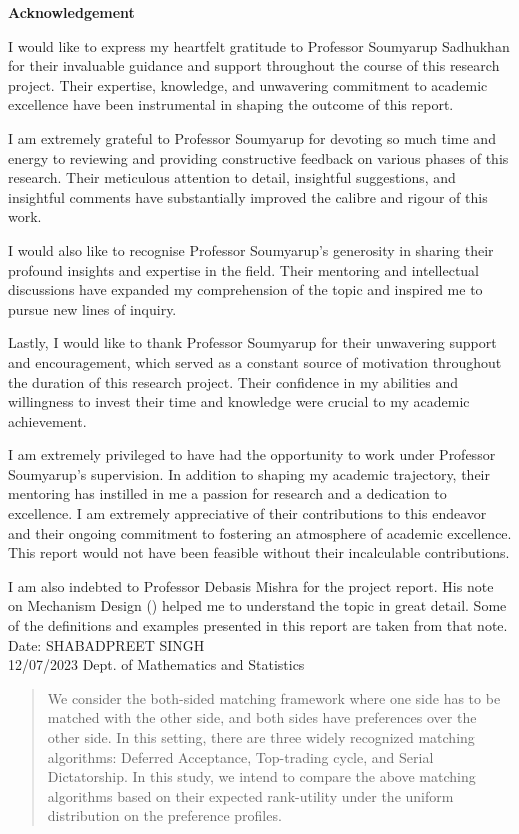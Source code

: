 \documentclass[a4paper,11pt,table]{article}
\date{}
\theoremstyle{definition}
\theoremstyle{remark}
\begin{document}
\tableofcontents
\pagebreak
\centerline{ \textbf{\huge Acknowledgement}}
\vspace{8mm}
I would like to express my heartfelt gratitude to Professor Soumyarup Sadhukhan for their invaluable guidance and support throughout the course of this research project. Their expertise, knowledge, and unwavering commitment to academic excellence have been instrumental in shaping the outcome of this report.

I am extremely grateful to Professor Soumyarup for devoting so much time and energy to reviewing and providing constructive feedback on various phases of this research. Their meticulous attention to detail, insightful suggestions, and insightful comments have substantially improved the calibre and rigour of this work.

I would also like to recognise Professor Soumyarup's generosity in sharing their profound insights and expertise in the field. Their mentoring and intellectual discussions have expanded my comprehension of the topic and inspired me to pursue new lines of inquiry.

Lastly, I would like to thank Professor Soumyarup for their unwavering support and encouragement, which served as a constant source of motivation throughout the duration of this research project. Their confidence in my abilities and willingness to invest their time and knowledge were crucial to my academic achievement.

I am extremely privileged to have had the opportunity to work under Professor Soumyarup's supervision. In addition to shaping my academic trajectory, their mentoring has instilled in me a passion for research and a dedication to excellence. I am extremely appreciative of their contributions to this endeavor and their ongoing commitment to fostering an atmosphere of academic excellence. This report would not have been feasible without their incalculable contributions.

I am also indebted to Professor Debasis Mishra for the project report. His note on Mechanism Design (\cite{mishra2008introduction}) helped me to understand the topic in great detail. Some of the definitions and examples presented in this report are taken from that note. 
\vspace{8mm}
\\
Date: \hfill SHABADPREET SINGH\\
12/07/2023 \hfill \hfill Dept. of Mathematics and Statistics
\clearpage

\begin{abstract}\singlespacing

We consider the both-sided matching framework where one side has to be matched with the other side, and both sides have preferences over the other side. In this setting, there are three widely recognized matching algorithms: Deferred Acceptance, Top-trading cycle, and Serial Dictatorship. In this study, we intend to compare the above matching algorithms based on their expected rank-utility under the uniform distribution on the preference profiles. 

		
	\end{abstract}
\end{document}
